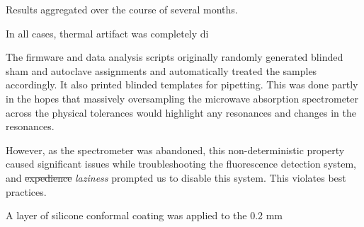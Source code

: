 \documentclass[paper.tex]{subfiles}
\begin{document}
Results aggregated over the course of several months.

In all cases, thermal artifact was completely di

The firmware and data analysis scripts originally randomly generated blinded sham and autoclave assignments and automatically treated the samples accordingly. It also printed blinded templates for pipetting. This was done partly in the hopes that massively oversampling the microwave absorption spectrometer across the physical tolerances would highlight any resonances and changes in the resonances. 

However, as the spectrometer was abandoned, this non-deterministic property caused significant issues while troubleshooting the fluorescence detection system, and \st{expedience} \textit{laziness} prompted us to disable this system. This violates best practices.

A layer of silicone conformal coating was applied to the 0.2 mm 
\end{document}
